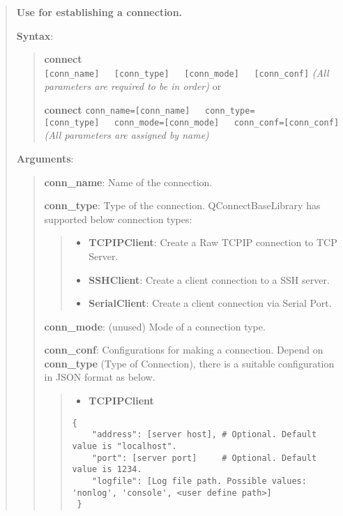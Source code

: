 \begin{quote}
\textbf{Use for establishing a connection.}

\textbf{Syntax}:

\begin{quote}
\textbf{connect}
\texttt{{[}conn\_name{]}\ \ \ {[}conn\_type{]}\ \ \ {[}conn\_mode{]}\ \ \ {[}conn\_conf{]}}
\emph{(All parameters are required to be in order)} or

\textbf{connect}
\texttt{conn\_name={[}conn\_name{]}\ \ \ conn\_type={[}conn\_type{]}\ \ \ conn\_mode={[}conn\_mode{]}\ \ \ conn\_conf={[}conn\_conf{]}}
\emph{(All parameters are assigned by name)}
\end{quote}

\textbf{Arguments}:

\begin{quote}
\textbf{conn\_name}: Name of the connection.

\textbf{conn\_type}: Type of the connection. QConnectBaseLibrary has
supported below connection types:

\begin{quote}
\begin{itemize}
\tightlist
\item
  \textbf{TCPIPClient}: Create a Raw TCPIP connection to TCP Server.
\item
  \textbf{SSHClient}: Create a client connection to a SSH server.
\item
  \textbf{SerialClient}: Create a client connection via Serial Port.
\end{itemize}
\end{quote}

\textbf{conn\_mode}: (unused) Mode of a connection type.

\textbf{conn\_conf}: Configurations for making a connection. Depend on
\textbf{conn\_type} (Type of Connection), there is a suitable
configuration in JSON format as below.

\begin{quote}
\begin{itemize}
\tightlist
\item
  \textbf{TCPIPClient}
\end{itemize}

\begin{verbatim}
{
    "address": [server host], # Optional. Default value is "localhost".
    "port": [server port]     # Optional. Default value is 1234.
    "logfile": [Log file path. Possible values: 'nonlog', 'console', <user define path>]
 }
\end{verbatim}


\end{quote}
\end{quote}
\end{quote}
